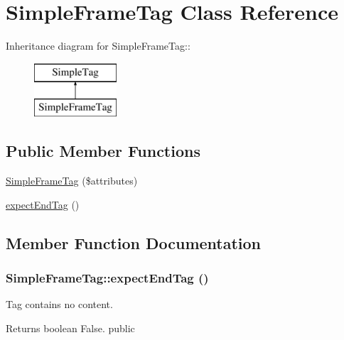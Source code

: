 \hypertarget{class_simple_frame_tag}{
\section{SimpleFrameTag Class Reference}
\label{class_simple_frame_tag}
}
Inheritance diagram for SimpleFrameTag::\begin{figure}[H]
\begin{center}
\leavevmode
\includegraphics[height=2cm]{class_simple_frame_tag}
\end{center}
\end{figure}
\subsection*{Public Member Functions}
\begin{DoxyCompactItemize}
\item 
\hyperlink{class_simple_frame_tag_a0a1034bef549bd8ed4896fdc83251867}{SimpleFrameTag} (\$attributes)
\item 
\hyperlink{class_simple_frame_tag_a2a20eeb19c812bb19b6c2c7e24bdc2ad}{expectEndTag} ()
\end{DoxyCompactItemize}


\subsection{Member Function Documentation}
\hypertarget{class_simple_frame_tag_a2a20eeb19c812bb19b6c2c7e24bdc2ad}{
\subsubsection[{expectEndTag}]{\setlength{\rightskip}{0pt plus 5cm}SimpleFrameTag::expectEndTag ()}}
\label{class_simple_frame_tag_a2a20eeb19c812bb19b6c2c7e24bdc2ad}
Tag contains no content. \begin{DoxyReturn}{Returns}
boolean False.  public 
\end{DoxyReturn}


